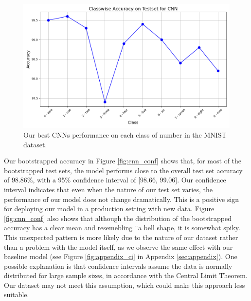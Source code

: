 \begin{figure}[H]
    \centering
    \includegraphics[width=\linewidth]{results/evaluation/CNN_classwise_acc.png}
    \caption{Our best CNNs performance on each class of number in the MNIST dataset.}
    \label{fig:ClasswiseAccuracyCNN}
\end{figure}

\newpage
Our bootstrapped accuracy in Figure \ref{fig:cnn_conf} shows that, for most of the bootstrapped test sets, the model performs close to the overall test set accuracy of 98.86\%, with a 95\% confidence interval of [98.66, 99.06]. Our confidence interval indicates that even when the nature of our test set varies, the performance of our model does not change dramatically. This is a positive sign for deploying our model in a production setting with new data. Figure \ref{fig:cnn_conf} also shows that although the distribution of the bootstrapped accuracy has a clear mean and resemebling ¨a bell shape, it is somewhat spiky. This unexpected pattern is more likely due to the nature of our dataset rather than a problem with the model itself, as we observe the same effect with our baseline model (see Figure \ref{fig:appendix_ci} in Appendix \ref{sec:appendix}). One possible explanation is that confidence intervals assume the data is normally distributed for large sample sizes, in accordance with the Central Limit Theorem. Our dataset may not meet this assumption, which could make this approach less suitable.
\newline
\newline

